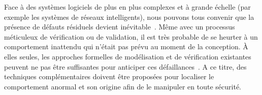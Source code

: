 %
Face à des systèmes logiciels de plus en plus complexes et à grande échelle (par exemple les systèmes de réseaux intelligents), nous pouvons tous convenir que la présence de défauts résiduels devient inévitable~\cite{DBLP:conf/icse/BarbosaLMJ17, DBLP:conf/icse/MongielloPS15, DBLP:conf/icse/HassanBB15}.
Même avec un processus méticuleux de vérification ou de validation, il est très probable de se heurter à un comportement inattendu qui n'était pas prévu au moment de la conception.
À elles seules, les approches formelles de modélisation et de vérification existantes peuvent ne pas être suffisantes pour anticiper ces défaillances~\cite{DBLP:conf/icse/TaharaOH17}.
A ce titre, des techniques complémentaires doivent être proposées pour localiser le comportement anormal et son origine afin de le manipuler en toute sécurité.

